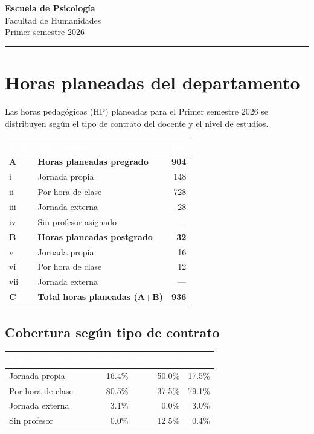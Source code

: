 \documentclass[11pt, a4paper]{article}
\begin{document}
\begin{center}
  {\Large\bfseries\color{usachDark} Escuela de Psicología} \\[0.4em]
  {\large\color{usachTeal} Facultad de Humanidades} \\[0.2em]
  {\normalsize\color{gray} Primer semestre 2026}
\end{center}
\vspace{0.5em}
\textcolor{usachTeal}{\rule{\linewidth}{2pt}}
\vspace{1em}

\section{Horas planeadas del departamento}

Las horas pedagógicas (HP) planeadas para el Primer semestre 2026 se distribuyen según el tipo de contrato del docente y el nivel de estudios.

\begin{tabularx}{\linewidth}{l X r}
\toprule
\rowcolor{usachDark} \textbf{\textcolor{white}{Cód.}} & \textbf{\textcolor{white}{Descripción}} & \textbf{\textcolor{white}{HP}} \\
\midrule
\rowcolor{rowHighlight}\textbf{A} & \textbf{Horas planeadas pregrado} & \textbf{904} \\
\rowcolor{rowEven}i & Jornada propia & 148 \\
ii & Por hora de clase & 728 \\
\rowcolor{rowEven}iii & Jornada externa & 28 \\
iv & Sin profesor asignado & --- \\
\rowcolor{rowHighlight}\textbf{B} & \textbf{Horas planeadas postgrado} & \textbf{32} \\
v & Jornada propia & 16 \\
\rowcolor{rowEven}vi & Por hora de clase & 12 \\
vii & Jornada externa & --- \\
\rowcolor{rowHighlight}\textbf{C} & \textbf{Total horas planeadas (A+B)} & \textbf{936} \\
\bottomrule
\end{tabularx}

\subsection{Cobertura según tipo de contrato}

\begin{tabular}{lrrr}
\toprule
\rowcolor{usachDark} \textbf{\textcolor{white}{Tipo de contrato}} & \textbf{\textcolor{white}{Pregrado}} & \textbf{\textcolor{white}{Postgrado}} & \textbf{\textcolor{white}{Total}} \\
\midrule
Jornada propia & 16.4\% & 50.0\% & 17.5\% \\
\rowcolor{rowEven}Por hora de clase & 80.5\% & 37.5\% & 79.1\% \\
Jornada externa & 3.1\% & 0.0\% & 3.0\% \\
\rowcolor{rowEven}Sin profesor & 0.0\% & 12.5\% & 0.4\% \\
\bottomrule
\end{tabular}
\end{document}
